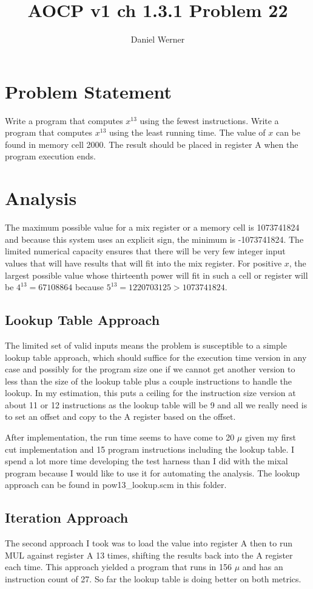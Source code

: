 \documentclass{article}
\title{AOCP v1 ch 1.3.1 Problem 22}
\author{Daniel Werner}
\begin{document}
\maketitle

\section*{
    Problem Statement
}

Write a program that computes $x^{13}$ using the fewest instructions.  Write a
program that computes $x^{13}$ using the least running time.  The value of $x$
can be found in memory cell 2000.  The result should be placed in register A
when the program execution ends.

\section*{
    Analysis
}

The maximum possible value for a mix register or a memory cell
is 1073741824 and because this system uses an explicit sign,
the minimum is -1073741824.  The limited numerical capacity ensures
that there will be very few integer input values that will have
results that will fit into the mix register.  For positive $x$, the largest
possible value whose thirteenth power will fit in such a cell
or register will be $4^{13}=67108864$ because $5^{13}=1220703125 >
1073741824$.

\subsection* {
  Lookup Table Approach
}
The limited set of valid inputs means the problem is susceptible to a
simple lookup table approach, which should suffice for the
execution time version in any case and possibly for the
program size one if we cannot get another version to less
than the size of the lookup table plus a couple instructions
to handle the lookup.  In my estimation, this puts a ceiling
for the instruction size version at about 11 or 12 instructions
as the lookup table will be 9 and all we really need is to
set an offset and copy to the A register based on the offset.

\par

After implementation, the run time seems to have come to 20 $\mu$ given my
first cut implementation and 15 program instructions including the
lookup table.  I spend a lot more time developing the
test harness than I did with the mixal program because I would like
to use it for automating the analysis.  The lookup approach can be
found in pow13\_lookup.scm in this folder.

\subsection* {
  Iteration Approach
}

The second approach I took was to load the value into register A then
to run MUL against register A 13 times, shifting the results back into
the A register each time.  This approach yielded a program that runs in
156 $\mu$ and has an instruction count of 27. So far the lookup table is
doing better on both metrics.
\end{document}
